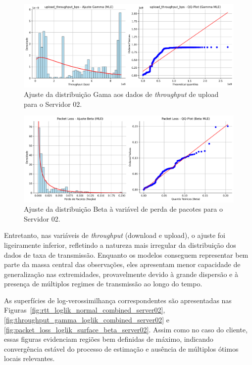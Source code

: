 \documentclass{article}
\begin{document}
\begin{figure}[htp]
	\includegraphics[width=\textwidth]{../figures/mle/upload_throughput_bps_ajuste_gamma_server02.png}
	\caption{Ajuste da distribuição Gama aos dados de \textit{throughput} de upload para o Servidor 02.}
	\label{fig:upload_throughput_bps_ajuste_gamma_server02}
\end{figure}

\begin{figure}[htp]
	\includegraphics[width=\textwidth]{../figures/mle/packet_loss_ajuste_beta_serve02.png}
	\caption{Ajuste da distribuição Beta à variável de perda de pacotes para o Servidor 02.}
	\label{fig:packet_loss_ajuste_beta_serve02}
\end{figure}

Entretanto, nas variáveis de \textit{throughput} (download e upload),
o ajuste foi ligeiramente inferior, refletindo a natureza mais irregular
da distribuição dos dados de taxa de transmissão.
Enquanto os modelos conseguem representar bem parte da massa central das observações,
eles apresentam menor capacidade de generalização nas extremidades,
provavelmente devido à grande dispersão e à presença de múltiplos regimes de transmissão
ao longo do tempo.

As superfícies de log-verossimilhança correspondentes são apresentadas nas
Figuras~\ref{fig:rtt_loglik_normal_combined_server02},
\ref{fig:throughput_gamma_loglik_combined_server02}
e \ref{fig:packet_loss_loglik_surface_beta_server02}.
Assim como no caso do cliente, essas figuras evidenciam regiões bem definidas de máximo,
indicando convergência estável do processo de estimação e ausência de múltiplos ótimos locais relevantes.
\end{document}
